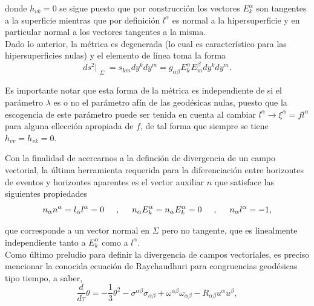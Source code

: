 \documentclass[16pt,a4paper]{article}
\numberwithin{equation}{section}
\theoremstyle{definition}
\begin{document}
donde $h_{vk} = 0$ se sigue puesto que por construcción los vectores $E^{\alpha}_{k}$ son tangentes a la superficie mientras que por definición $l^\alpha$ es normal a la hipersuperficie y en particular normal a los vectores tangentes a la misma. \\

Dado lo anterior, la métrica es degenerada (lo cual es característico para las hipersuperficies nulas) y el elemento de línea toma la forma
\begin{equation*}
ds^2|_{\substack{\Sigma}} = s_{km}dy^k dy^m = g_{\alpha \beta} E^{\alpha}_{k} E^{\beta}_{m} dy^k dy^m.
\end{equation*}

Es importante notar que esta forma de la métrica es independiente de si el parámetro $\lambda$ es o no el parámetro afín de las geodésicas nulas, puesto que la escogencia de este parámetro puede ser tenida en cuenta al cambiar $l^\alpha \to \xi^\alpha = fl^\alpha$ para alguna ellección apropiada de $f$, de tal forma que siempre se tiene $h_{vv} = h_{vk} = 0$.

Con la finalidad de acercarnos a la definción de divergencia de un campo vectorial, la última herramienta requerida para la diferenciación entre horizontes de eventos y horizontes aparentes es el vector auxiliar $n$ que satisface las siguientes propiedades
\begin{equation}
\label{prop div}
n_\alpha n^\alpha = l_\alpha l^\alpha = 0 \hspace{.5cm},\hspace{.5cm} n_\alpha E^{\alpha}_{k} =  n_\alpha E^{\alpha}_{k} = 0 \hspace{.5cm},\hspace{.5cm} n_\alpha l^\alpha = -1,
\end{equation}

que corresponde a un vector normal en $\Sigma$ pero no tangente, que es linealmente independiente tanto a $E^{\alpha}_{k}$ como a $l^\alpha$.\\

Como último preludio para definir la divergencia de campos vectoriales, es preciso mencionar la conocida ecuación de Raychaudhuri para congruencias geodésicas tipo tiempo, a saber,
\begin{equation*}
\frac{d}{d\tau}\theta = -\frac{1}{3}\theta^2 - \sigma^{\alpha \beta}\sigma_{\alpha \beta} + \omega^{\alpha \beta}\omega_{\alpha \beta}-R_{\alpha \beta}u^\alpha u^\beta,
\end{equation*}
\end{document}
